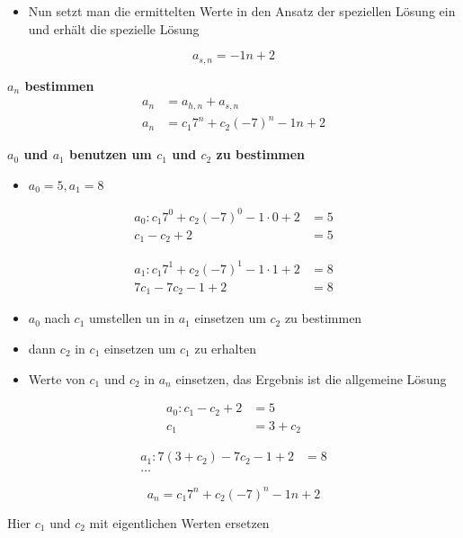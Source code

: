 \begin{itemize}
\item Nun setzt man die ermittelten Werte in den Ansatz der speziellen Lösung ein und erhält die spezielle Lösung
\end{itemize}
$$
\boxed{a_{s,n} =  -1n + 2}
$$

\textbf{$a_n$ bestimmen}
\begin{align*}
a_n &= a_{h,n} + a_{s,n}\\
a_n & = c_1 7^n + c_2 (-7)^n -1n + 2
\end{align*}

\textbf{$a_0$ und $a_1$ benutzen um $c_1$ und $c_2$ zu bestimmen}

\begin{itemize}
\item $a_0 = 5, a_1 = 8$
\end{itemize}

\begin{align*}
a_0: c_1 7^0 + c_2(-7)^0 - 1 \cdot 0 + 2 &= 5\\
c_1 - c_2 + 2 &= 5
\end{align*}

\begin{align*}
a_1: c_1 7^1 + c_2(-7)^1 - 1\cdot 1 + 2 &= 8\\
7c_1 - 7c_2 -1 + 2 &= 8
\end{align*}

\begin{itemize}
\item $a_0$ nach $c_1$ umstellen un in $a_1$ einsetzen um $c_2$ zu bestimmen
\item dann $c_2$ in $c_1$ einsetzen um $c_1$ zu erhalten
\item Werte von $c_1$ und $c_2$ in $a_n$ einsetzen, das Ergebnis ist die allgemeine Lösung
\end{itemize}

\begin{align*}
a_0: c_1 - c_2 + 2 &= 5\\
c_1 &= 3 + c_2
\end{align*}

\begin{align*}
a_1: 7(3 + c_2) - 7c_2 -1 + 2 &= 8\\
\dots
\end{align*}

$$
\boxed{a_n = c_1 7^n + c_2 (-7)^n -1n + 2}
$$

Hier $c_1$ und $c_2$ mit eigentlichen Werten ersetzen

\newpage

